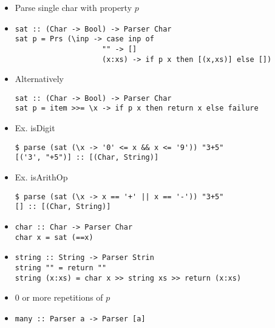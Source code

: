 \begin{itemize}
\begin{itemize}
                \begin{itemize}
                    \item Parse single char with property $p$
                    \item
\begin{verbatim}
sat :: (Char -> Bool) -> Parser Char
sat p = Prs (\inp -> case inp of
                    "" -> []
                    (x:xs) -> if p x then [(x,xs)] else [])
\end{verbatim}
                    \item Alternatively
\begin{verbatim}
sat :: (Char -> Bool) -> Parser Char
sat p = item >>= \x -> if p x then return x else failure
\end{verbatim}
                    \item Ex. isDigit
\begin{verbatim}
$ parse (sat (\x -> '0' <= x && x <= '9')) "3+5"
[('3', "+5")] :: [(Char, String)]
\end{verbatim}
                    \item Ex. isArithOp
\begin{verbatim}
$ parse (sat (\x -> x == '+' || x == '-')) "3+5"
[] :: [(Char, String)]
\end{verbatim}
                \end{itemize}
                \begin{itemize}
                    \item
\begin{verbatim}
char :: Char -> Parser Char
char x = sat (==x)
\end{verbatim}
                \end{itemize}
                \begin{itemize}
                    \item
\begin{verbatim}
string :: String -> Parser Strin
string "" = return ""
string (x:xs) = char x >> string xs >> return (x:xs)
\end{verbatim}
                \end{itemize}
                \begin{itemize}
                    \item $0$ or more repetitions of $p$
                    \item
\begin{verbatim}
many :: Parser a -> Parser [a]

\end{verbatim}
\end{itemize}
\end{itemize}
\end{itemize}
